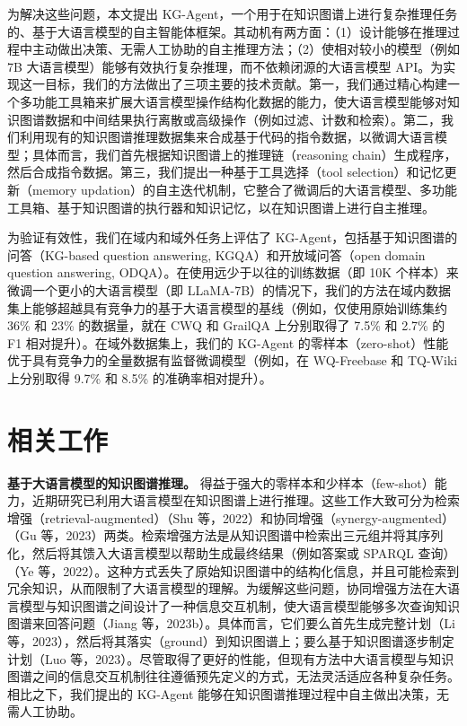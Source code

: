 \documentclass[11pt,UTF8,fontset=fandol]{ctexart}
\begin{document}
为解决这些问题，本文提出 KG-Agent，一个用于在知识图谱上进行复杂推理任务的、基于大语言模型的自主智能体框架。其动机有两方面：（1）设计能够在推理过程中主动做出决策、无需人工协助的自主推理方法；（2）使相对较小的模型（例如 7B 大语言模型）能够有效执行复杂推理，而不依赖闭源的大语言模型 API。为实现这一目标，我们的方法做出了三项主要的技术贡献。第一，我们通过精心构建一个多功能工具箱来扩展大语言模型操作结构化数据的能力，使大语言模型能够对知识图谱数据和中间结果执行离散或高级操作（例如过滤、计数和检索）。第二，我们利用现有的知识图谱推理数据集来合成基于代码的指令数据，以微调大语言模型；具体而言，我们首先根据知识图谱上的推理链（reasoning chain）生成程序，然后合成指令数据。第三，我们提出一种基于工具选择（tool selection）和记忆更新（memory updation）的自主迭代机制，它整合了微调后的大语言模型、多功能工具箱、基于知识图谱的执行器和知识记忆，以在知识图谱上进行自主推理。

为验证有效性，我们在域内和域外任务上评估了 KG-Agent，包括基于知识图谱的问答（KG-based question answering, KGQA）和开放域问答（open domain question answering, ODQA）。在使用远少于以往的训练数据（即 10K 个样本）来微调一个更小的大语言模型（即 LLaMA-7B）的情况下，我们的方法在域内数据集上能够超越具有竞争力的基于大语言模型的基线（例如，仅使用原始训练集约 36\% 和 23\% 的数据量，就在 CWQ 和 GrailQA 上分别取得了 7.5\% 和 2.7\% 的 F1 相对提升）。在域外数据集上，我们的 KG-Agent 的零样本（zero-shot）性能优于具有竞争力的全量数据有监督微调模型（例如，在 WQ-Freebase 和 TQ-Wiki 上分别取得 9.7\% 和 8.5\% 的准确率相对提升）。

\section{相关工作}

\textbf{基于大语言模型的知识图谱推理。}
得益于强大的零样本和少样本（few-shot）能力，近期研究已利用大语言模型在知识图谱上进行推理。这些工作大致可分为检索增强（retrieval-augmented）（Shu 等，2022）和协同增强（synergy-augmented）（Gu 等，2023）两类。检索增强方法是从知识图谱中检索出三元组并将其序列化，然后将其馈入大语言模型以帮助生成最终结果（例如答案或 SPARQL 查询）（Ye 等，2022）。这种方式丢失了原始知识图谱中的结构化信息，并且可能检索到冗余知识，从而限制了大语言模型的理解。为缓解这些问题，协同增强方法在大语言模型与知识图谱之间设计了一种信息交互机制，使大语言模型能够多次查询知识图谱来回答问题（Jiang 等，2023b）。具体而言，它们要么首先生成完整计划（Li 等，2023），然后将其落实（ground）到知识图谱上；要么基于知识图谱逐步制定计划（Luo 等，2023）。尽管取得了更好的性能，但现有方法中大语言模型与知识图谱之间的信息交互机制往往遵循预先定义的方式，无法灵活适应各种复杂任务。相比之下，我们提出的 KG-Agent 能够在知识图谱推理过程中自主做出决策，无需人工协助。
\end{document}
